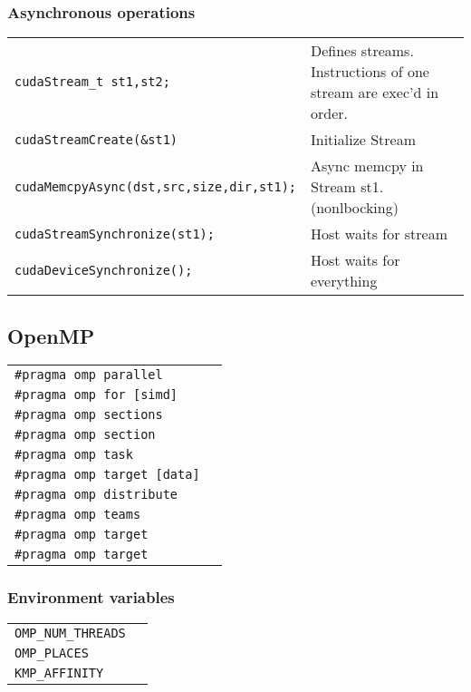 \documentclass[11pt]{article}
\begin{document}
\subsubsection{Asynchronous operations}
\begin{tabular}{ p{7cm} l }
	\lstinline$cudaStream_t st1,st2;$ & Defines streams. Instructions of one stream are exec'd in order.\\
	\lstinline$cudaStreamCreate(&st1)$& Initialize Stream\\
	\lstinline$cudaMemcpyAsync(dst,src,size,dir,st1);$& Async memcpy in Stream st1. (nonlbocking)\\
	\lstinline$cudaStreamSynchronize(st1);$ & Host waits for stream\\
	\lstinline$cudaDeviceSynchronize();$ & Host waits for everything \\
\end{tabular}

\subsection{OpenMP}

\begin{tabular}{ p{7cm} l }
	\lstinline$#pragma omp parallel$ & \\
	\lstinline$#pragma omp for [simd]$ & \\
	\lstinline$#pragma omp sections$ & \\
	\lstinline$#pragma omp section$ & \\
	\lstinline$#pragma omp task$ & \\
	\lstinline$#pragma omp target [data]$ & \\
	\lstinline$#pragma omp distribute$ & \\
	\lstinline$#pragma omp teams$ & \\ 
	\lstinline$#pragma omp target$ & \\
	\lstinline$#pragma omp target$ & \\
\end{tabular}

\subsubsection{Environment variables}

\begin{tabular}{ p{7cm} l }
	\lstinline$OMP_NUM_THREADS$ & \\
	\lstinline$OMP_PLACES$ & \\
	\lstinline$KMP_AFFINITY$ & \\
\end{tabular}
\end{document}

